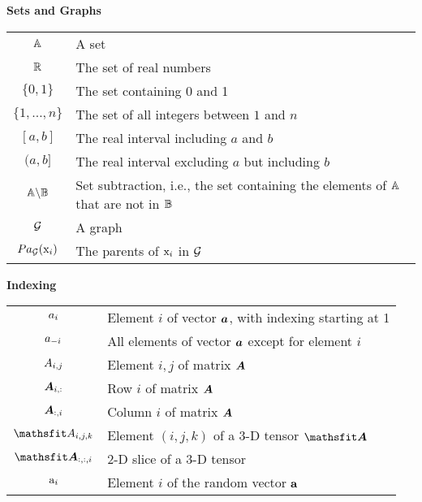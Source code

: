 \vspace{\notationgap}
\begin{minipage}{\textwidth}
	\centerline{\bf Sets and Graphs}
	\bgroup
	\def\arraystretch{1.5}
	\begin{tabular}{cp{3.25in}}
		$\displaystyle {\mathbb{A}}$ & A set\\
		$\displaystyle \mathbb{R}$ & The set of real numbers \\
		$\displaystyle \{0, 1\}$ & The set containing 0 and 1 \\
		$\displaystyle \{1, \dots, n \}$ & The set of all integers between $1$ and $n$\\
		$\displaystyle [a, b]$ & The real interval including $a$ and $b$\\
		$\displaystyle (a, b]$ & The real interval excluding $a$ but including $b$\\
		$\displaystyle {\mathbb{A}} \backslash {\mathbb{B}}$ & Set subtraction, i.e., the set containing the elements of ${\mathbb{A}}$ that are not in ${\mathbb{B}}$\\
		$\displaystyle {\mathcal{G}}$ & A graph\\
		$\displaystyle Pa_{\mathcal{G}}({\textnormal{x}}_i)$ & The parents of ${\textnormal{x}}_i$ in ${\mathcal{G}}$
	\end{tabular}
	\egroup
\end{minipage}

\vspace{\notationgap}
\begin{minipage}{\textwidth}
	\centerline{\bf Indexing}
	\bgroup
	\def\arraystretch{1.5}
	\begin{tabular}{cp{3.25in}}
		$\displaystyle {a}_i$ & Element $i$ of vector ${\bm{a}}$, with indexing starting at 1 \\
		$\displaystyle {a}_{-i}$ & All elements of vector ${\bm{a}}$ except for element $i$ \\
		$\displaystyle {A}_{i,j}$ & Element $i, j$ of matrix ${\bm{A}}$ \\
		$\displaystyle {\bm{A}}_{i, :}$ & Row $i$ of matrix ${\bm{A}}$ \\
		$\displaystyle {\bm{A}}_{:, i}$ & Column $i$ of matrix ${\bm{A}}$ \\
		$\displaystyle \etA_{i, j, k}$ & Element $(i, j, k)$ of a 3-D tensor $\tA$\\
		$\displaystyle \tA_{:, :, i}$ & 2-D slice of a 3-D tensor\\
		$\displaystyle {\textnormal{a}}_i$ & Element $i$ of the random vector ${\mathbf{a}}$ \\
	\end{tabular}
	\egroup
\end{minipage}

